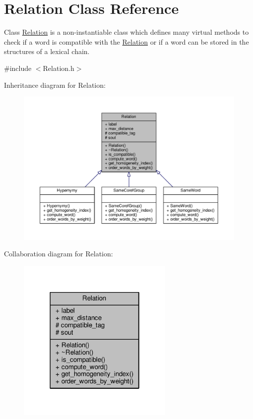 \hypertarget{classRelation}{}\section{Relation Class Reference}
\label{classRelation}


Class \hyperlink{classRelation}{Relation} is a non-\/instantiable class which defines many virtual methods to check if a word is compatible with the \hyperlink{classRelation}{Relation} or if a word can be stored in the structures of a lexical chain.  




{\ttfamily \#include $<$Relation.\+h$>$}



Inheritance diagram for Relation\+:\nopagebreak
\begin{figure}[H]
\begin{center}
\leavevmode
\includegraphics[width=350pt]{classRelation__inherit__graph}
\end{center}
\end{figure}


Collaboration diagram for Relation\+:\nopagebreak
\begin{figure}[H]
\begin{center}
\leavevmode
\includegraphics[width=214pt]{classRelation__coll__graph}
\end{center}
\end{figure}

